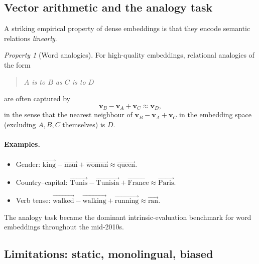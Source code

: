 \documentclass[12pt,a4paper]{report}
\theoremstyle{definition}
\theoremstyle{remark}
\newtheorem{property}{Property}[section]
\begin{document}
\subsection{Vector arithmetic and the analogy task}

A striking empirical property of dense embeddings is that they encode semantic relations \emph{linearly}.

\begin{property}[Word analogies]
For high-quality embeddings, relational analogies of the form
\begin{quote}
\emph{$A$ is to $B$ as $C$ is to $D$}
\end{quote}
are often captured by
\[ \mathbf{v}_B - \mathbf{v}_A + \mathbf{v}_C \approx \mathbf{v}_D, \]
in the sense that the nearest neighbour of $\mathbf{v}_B - \mathbf{v}_A + \mathbf{v}_C$ in the embedding space (excluding $A, B, C$ themselves) is $D$.
\end{property}

\paragraph{Examples.}
\begin{itemize}
    \item Gender: $\overrightarrow{\text{king}} - \overrightarrow{\text{man}} + \overrightarrow{\text{woman}} \approx \overrightarrow{\text{queen}}$.
    \item Country--capital: $\overrightarrow{\text{Tunis}} - \overrightarrow{\text{Tunisia}} + \overrightarrow{\text{France}} \approx \overrightarrow{\text{Paris}}$.
    \item Verb tense: $\overrightarrow{\text{walked}} - \overrightarrow{\text{walking}} + \overrightarrow{\text{running}} \approx \overrightarrow{\text{ran}}$.
\end{itemize}

The analogy task became the dominant intrinsic-evaluation benchmark for word embeddings throughout the mid-2010s.

\subsection{Limitations: static, monolingual, biased}
\end{document}
